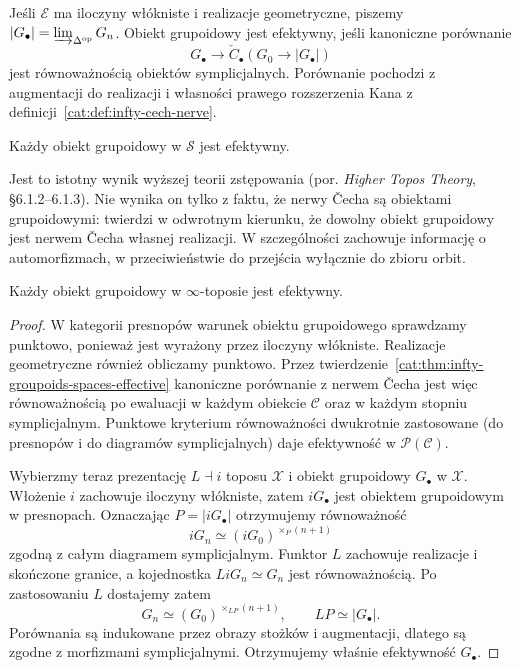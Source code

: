 \begin{definicja}\label{cat:def:infty-effective-groupoid}
Jeśli $\mathcal E$ ma iloczyny włókniste i realizacje geometryczne, piszemy $|G_\bullet|=\varinjlim_{\Delta^{\mathrm{op}}}G_n$. Obiekt grupoidowy jest efektywny, jeśli kanoniczne porównanie
\[
 G_\bullet\longrightarrow\check C_\bullet(G_0\to |G_\bullet|)
\]
jest równoważnością obiektów symplicjalnych. Porównanie pochodzi z augmentacji do realizacji i własności prawego rozszerzenia Kana z definicji~\ref{cat:def:infty-cech-nerve}.
\end{definicja}

\begin{twierdzenie}\label{cat:thm:infty-groupoids-spaces-effective}
Każdy obiekt grupoidowy w $\mathcal S$ jest efektywny.
\end{twierdzenie}

Jest to istotny wynik wyższej teorii zstępowania (por. \emph{Higher Topos Theory}, \S6.1.2--6.1.3). Nie wynika on tylko z faktu, że nerwy Čecha są obiektami grupoidowymi: twierdzi w odwrotnym kierunku, że dowolny obiekt grupoidowy jest nerwem Čecha własnej realizacji. W szczególności zachowuje informację o automorfizmach, w przeciwieństwie do przejścia wyłącznie do zbioru orbit.

\begin{stwierdzenie}\label{cat:prop:infty-topos-effective-groupoids}
Każdy obiekt grupoidowy w $\infty$-toposie jest efektywny.
\end{stwierdzenie}
\begin{proof}
W kategorii presnopów warunek obiektu grupoidowego sprawdzamy punktowo, ponieważ jest wyrażony przez iloczyny włókniste. Realizacje geometryczne również obliczamy punktowo. Przez twierdzenie~\ref{cat:thm:infty-groupoids-spaces-effective} kanoniczne porównanie z nerwem Čecha jest więc równoważnością po ewaluacji w każdym obiekcie $\mathcal C$ oraz w każdym stopniu symplicjalnym. Punktowe kryterium równoważności dwukrotnie zastosowane (do presnopów i do diagramów symplicjalnych) daje efektywność w $\mathcal P(\mathcal C)$.

Wybierzmy teraz prezentację $L\dashv i$ toposu $\mathcal X$ i obiekt grupoidowy $G_\bullet$ w $\mathcal X$. Włożenie $i$ zachowuje iloczyny włókniste, zatem $iG_\bullet$ jest obiektem grupoidowym w presnopach. Oznaczając $P=|iG_\bullet|$ otrzymujemy równoważność
\[
 iG_n\simeq (iG_0)^{\times_P(n+1)}
\]
zgodną z całym diagramem symplicjalnym. Funktor $L$ zachowuje realizacje i skończone granice, a kojednostka $LiG_n\simeq G_n$ jest równoważnością. Po zastosowaniu $L$ dostajemy zatem
\[
 G_n\simeq (G_0)^{\times_{LP}(n+1)},
 \qquad LP\simeq|G_\bullet|.
\]
Porównania są indukowane przez obrazy stożków i augmentacji, dlatego są zgodne z morfizmami symplicjalnymi. Otrzymujemy właśnie efektywność $G_\bullet$.
\end{proof}

